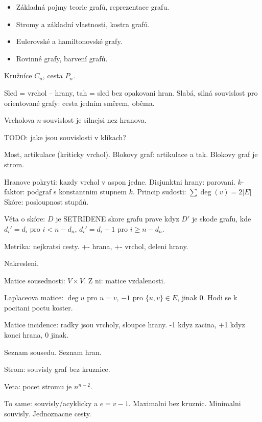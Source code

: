 \begin{itemize}
\item Základná pojmy teorie grafů, reprezentace grafu.
\item Stromy a základní vlastnosti, kostra grafů.
\item Eulerovské a hamiltonovské grafy.
\item Rovinné grafy, barvení grafů.
\end{itemize}

\begin{understood}
Kružníce $C_n$, cesta $P_n$.
\end{understood}
Sled = vrchol -- hrany, tah = sled bez opakovani hran.
Slabá, silná souvislost pro orientované grafy:
cesta jedním směrem, oběma.

Vrcholova $n$-souvislost je silnejsi nez hranova.

TODO: jake jsou souvislosti v klikach?

Most, artikulace (kriticky vrchol).
Blokovy graf: artikulace a tak. Blokovy graf je strom.

Hranove pokryti: kazdy vrchol v aspon jedne.
Disjunktni hrany: parovani.
$k$-faktor: podgraf s konstantnim stupnem $k$.
Princip sudosti: $\sum\deg(v)=2|E|$
Skóre: posloupnost stupňů.

Věta o skóre: $D$ je SETRIDENE skore grafu prave kdyz $D'$
je skode grafu, kde $d_i'=d_i$ pro $i<n-d_n$,
$d_i'=d_i-1$ pro $i\geq n-d_n$.

Metrika: nejkratsi cesty.
+- hrana, +- vrchol, deleni hrany.

Nakresleni.
\begin{understood}
Matice sousednosti: $V\times V$.
Z ni: matice vzdalenosti.
\end{understood}

Laplaceova matice: $\deg u$ pro $u=v$, $-1$ pro $\{u,v\}\in E$,
jinak 0. Hodi se k pocitani poctu koster.

Matice incidence: radky jsou vrcholy, sloupce hrany.
-1 kdyz zacina, +1 kdyz konci hrana, 0 jinak.

\begin{understood}
Seznam sousedu. Seznam hran.

Strom: souvisly graf bez kruznice.
\end{understood}

Veta: pocet stromu je $n^{n-2}$.

\begin{understood}
To same: souvisly/acyklicky a $e=v-1$.
Maximalni bez kruznic. Minimalni souvisly.
Jednoznacne cesty.
\end{understood}

